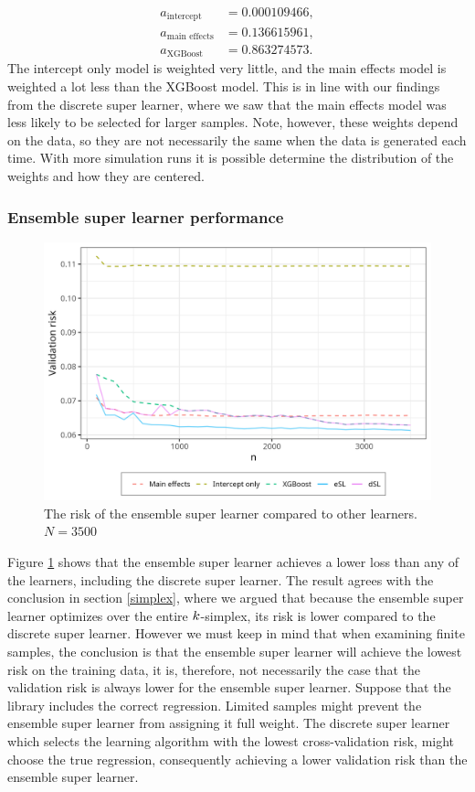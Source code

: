 \documentclass[./main.tex]{subfiles}
\begin{document}
\begin{align*}
    a_{\text{intercept}} &= 0.000109466, \\
    a_{\text{main effects}} &= 0.136615961, \\
    a_{\text{XGBoost}} &= 0.863274573.
\end{align*}
The intercept only model is weighted very little, and the main effects model is weighted a lot less than the XGBoost model. This is in line with our findings from the discrete super learner, where we saw that the main effects model was less likely to be selected for larger samples. Note, however, these weights depend on the data, so they are not necessarily the same when the data is generated each time. With more simulation runs it is possible determine the distribution of the weights and how they are centered. 

\subsubsection{Ensemble super learner performance}
\begin{figure}[H]
    \centering
    \includegraphics[width=\textwidth]{figures/losses_esl_s23.png}
    \caption{The risk of the ensemble super learner compared to other learners. $ N = 3500 $}
    \label{fig:losses_esl_s23}
\end{figure}
Figure \ref{fig:losses_esl_s23} shows that the ensemble super learner achieves a lower loss than any of the learners, including the discrete super learner. The result agrees with the conclusion in section \ref{simplex}, where we argued that because the ensemble super learner optimizes over the entire $ k $-simplex, its risk is lower compared to the discrete super learner. However we must keep in mind that when examining finite samples, the conclusion is that the ensemble super learner will achieve the lowest risk on the training data, it is, therefore, not necessarily the case that the validation risk is always lower for the ensemble super learner. Suppose that the library includes the correct regression. Limited samples might prevent the ensemble super learner from assigning it full weight. The discrete super learner which selects the learning algorithm with the lowest cross-validation risk, might choose the true regression, consequently achieving a lower validation risk than the ensemble super learner.
\end{document}
